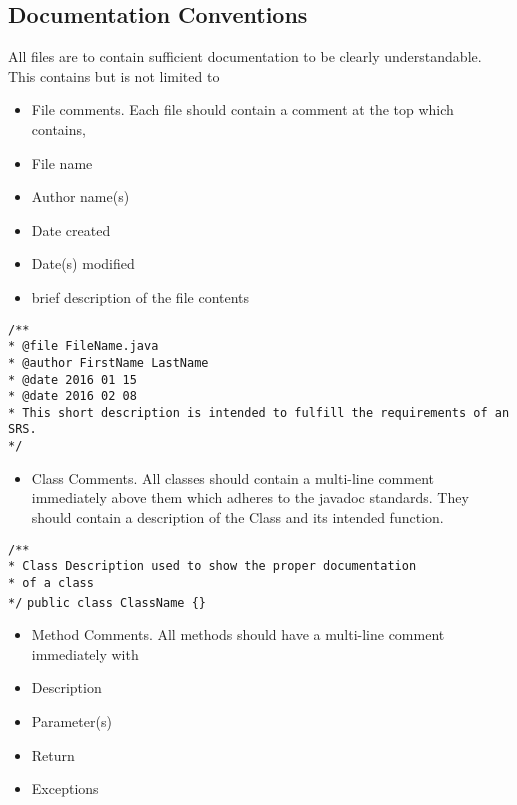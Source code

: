 \documentclass{scrreprt}
\begin{document}
\subsection{Documentation Conventions}
All files are to contain sufficient documentation to be clearly understandable. This
contains but is not limited to
\begin{itemize}
\item File comments. Each file should contain a comment at the top which contains,
\item File name
\item Author name(s)
\item Date created
\item Date(s) modified
\item brief description of the file contents
\end{itemize}

\texttt{/** \\}
\texttt{* @file FileName.java \\}
\texttt{* @author FirstName LastName\\}
\texttt{* @date 2016 01 15 \\}
\texttt{* @date 2016 02 08\\}
\texttt{* This short description is intended to fulfill the requirements of an SRS. \\}
\texttt{*/ \\}

\begin{itemize}
\item Class Comments. All classes should contain a multi-line comment immediately above them which adheres to
the javadoc standards. They should contain a description of the Class and its intended function. \\
\end{itemize}

\texttt{/** \\}
\texttt{* Class Description used to show the proper documentation \\}
\texttt{* of a class \\}
\texttt{*/}
\texttt{public class ClassName \{\}}

\begin{itemize}
\item Method Comments. All methods should have a multi-line comment immediately with
\item Description
\item Parameter(s)
\item Return
\item Exceptions
\end{itemize}
\end{document}
